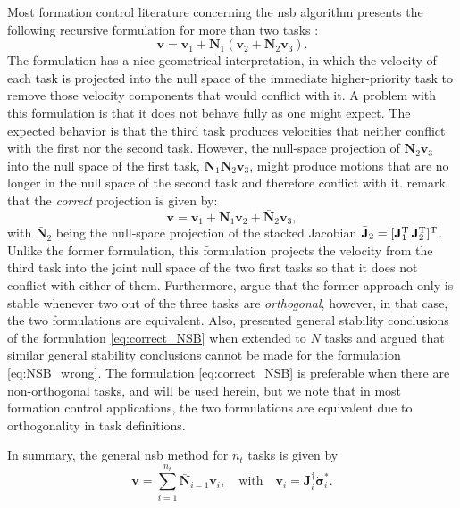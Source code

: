 Most formation control literature concerning the \gls{nsb} algorithm presents the following recursive formulation for more than two tasks \citep{arrichiello_formation_2006, antonelli_kinematic_2006,matous_singularity-free_2022}:
\begin{equation}
    \mathbf{v} = \mathbf{v}_1 + \mathbf{N}_1\left(\mathbf{v}_2 + \mathbf{N}_2 \mathbf{v}_3\right).\label{eq:NSB_wrong}
\end{equation}
The formulation has a nice geometrical interpretation, in which the velocity of each task is projected into the null space of the immediate higher-priority task to remove those velocity components that would conflict with it. A problem with this formulation is that it does not behave fully as one might expect. The expected behavior is that the third task produces velocities that neither conflict with the first nor the second task. However, the null-space projection of $\mathbf{N}_2 \mathbf{v}_3$ into the null space of the first task, $\mathbf{N}_1\mathbf{N}_2 \mathbf{v}_3$, might produce motions that are no longer in the null space of the second task and therefore conflict with it. \cite{antonelli_stability_2008} remark that the \textit{correct} projection is given by:
\begin{equation}
    \mathbf{v} = \mathbf{v}_1 + \mathbf{N}_1 \mathbf{v}_2 + \bar{\mathbf{N}}_2\mathbf{v}_3,\label{eq:correct_NSB}
\end{equation}
with $\bar{\mathbf{N}}_2$ being the null-space projection of the stacked Jacobian $\bar{\mathbf{J}}_2 = [\mathbf{J}_1^{\rm T}\, \mathbf{J}_{2}^{\rm T}]^{\rm T}$. Unlike the former formulation, this formulation projects the velocity from the third task into the joint null space of the two first tasks so that it does not conflict with either of them. Furthermore, \cite{antonelli_stability_2008} argue that the former approach only is stable whenever two out of the three tasks are \textit{orthogonal}, however, in that case, the two formulations are equivalent. Also, \cite{antonelli_stability_2008} presented general stability conclusions of the formulation \eqref{eq:correct_NSB} when extended to $N$ tasks and argued that similar general stability conclusions cannot be made for the formulation \eqref{eq:NSB_wrong}. The formulation \eqref{eq:correct_NSB} is preferable when there are non-orthogonal tasks, and will be used herein, but we note that in most formation control applications, the two formulations are equivalent due to orthogonality in task definitions.

In summary, the general \gls{nsb} method for $n_t$ tasks is given by
\begin{equation}\label{eq:NSB_first_order_general}
    \mathbf{v} = \sum_{i=1}^{n_t} \bar{\mathbf{N}}_{i-1}\mathbf{v}_i, \quad \mathrm{with} \quad \mathbf{v}_i = \mathbf{J}_i^\dagger\dot{\bm{\sigma}}_i^*.
\end{equation}
